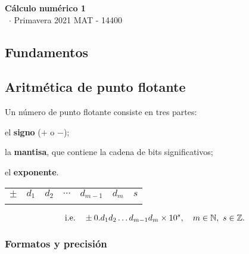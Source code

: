 \documentclass[8pt,a4paper]{extarticle}
\renewcommand{\csClass}{Cálculo numérico 1}
\renewcommand{\csClassCode}{MAT - 14400}
\renewcommand{\csTerm}{Primavera 2021}
\begin{document}
\begin{titlepage}
	\begin{center}
		\vspace*{1cm}
		\Huge
		\textbf{\csClass}
		\vspace{0.5cm} \\
		\Large
		\cs\ $\cdot$ \csTerm
		\vfill
		\csAuthorName
		\vspace{0.8cm}
		\csClassCode\\
		\csSchool
	\end{center}
\end{titlepage}

\begin{multicols}{3}
	\setcounter{page}{1}

	\section*{Fundamentos}

	\subsection{Aritmética de punto flotante}

	Un número de punto flotante consiste en tres partes:

	\begin{numberlist}
		\item el \textbf{signo} ($+$ o $-$);
		\item la \textbf{mantisa}, que contiene la cadena de bits significativos;
		\item el \textbf{exponente}.
	\end{numberlist}

	\begin{center}
		\begin{tabular}{| c || c | c | c | c | c || c |}
			\hhline{-||-----||-}
			$\pm$ & $d_1$ & $d_2$ & $\cdots$ & $d_{m-1}$ & $d_m$ & $s$ \\
			\hhline{-||-----||-}
		\end{tabular}
	\end{center}

	\[
		\text{\normalfont i.e.} \quad \pm 0.d_1 d_2 \ldots d_{m-1} d_m \times 10^s, \quad m \in \mathbb{N},\ s \in \mathbb{Z}
		.\]

	\subsubsection*{Formatos y precisión}


\end{multicols}
\end{document}
